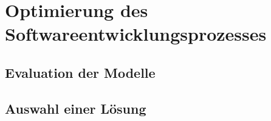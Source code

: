 \newpage
\section{Optimierung des Softwareentwicklungsprozesses}
\subsection{Evaluation der Modelle}

\subsection{Auswahl einer Lösung}